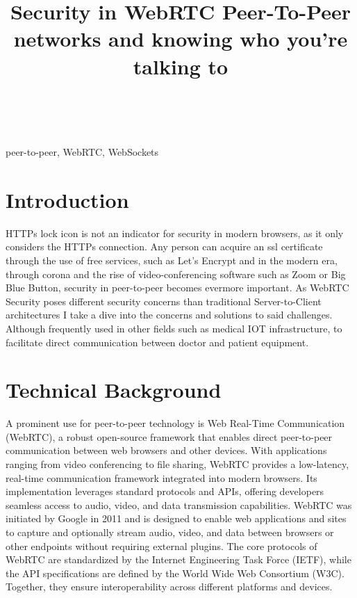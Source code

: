 \documentclass[conference]{IEEEtran}
\begin{document}
\title{Security in WebRTC Peer-To-Peer networks and knowing who you're talking to\\
}

\author{
 \\
\textit{}
}

\maketitle

\begin{abstract}
\end{abstract}

\begin{IEEEkeywords}
peer-to-peer, WebRTC, WebSockets
\end{IEEEkeywords}

\section{Introduction}

HTTPs lock icon is not an indicator for security in modern browsers, as it only considers the HTTPs connection. \cite{BrowserToBrowserSecurity}
Any person can acquire an ssl certificate through the use of free services, such as Let's Encrypt %
and in the modern era, through corona and the rise of video-conferencing software such as Zoom or Big Blue Button, 
security in peer-to-peer becomes evermore important. As WebRTC Security poses different security concerns than
traditional Server-to-Client architectures I take a dive into the concerns and solutions to said challenges.
Although frequently used in other fields such as medical IOT infrastructure, to facilitate direct communication between
doctor and patient equipment.  

\section{Technical Background}
A prominent use for peer-to-peer technology is Web Real-Time Communication (WebRTC), a robust open-source framework that enables direct peer-to-peer 
communication between web browsers and other devices. With applications ranging from video conferencing 
to file sharing, WebRTC provides a low-latency, real-time communication framework integrated into modern 
browsers. Its implementation leverages standard protocols and APIs, offering developers seamless access to 
audio, video, and data transmission capabilities. %
WebRTC was initiated by Google in 2011 and is designed to enable web applications and sites to capture and optionally 
stream audio, video, and data between browsers or other endpoints without requiring external plugins.
The core protocols of WebRTC are standardized by the Internet Engineering Task Force (IETF), while the API specifications 
are defined by the World Wide Web Consortium (W3C). Together, they ensure interoperability across different platforms and devices.
\end{document}
